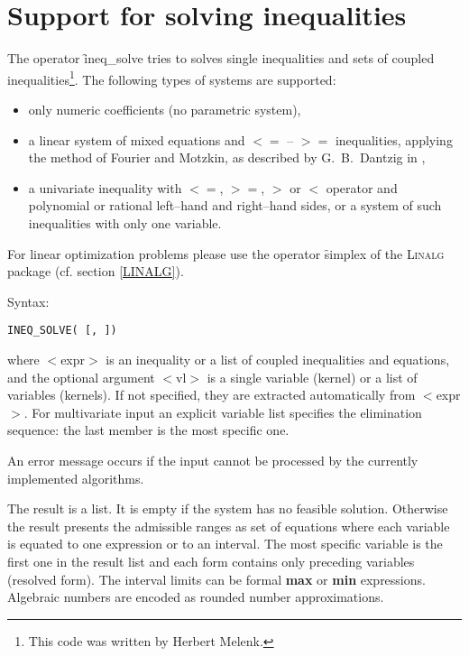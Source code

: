 \section{Support for solving inequalities}
\hypertarget{operator:INEQ_SOLVE}{}
The operator \f{ineq\_solve}
tries to solves single inequalities and sets of coupled inequalities\footnote{This code was written by Herbert Melenk.}.
The following types of systems are supported:
\begin{itemize}
\item only numeric coefficients (no parametric system),
\item a linear system of mixed equations and $<=$ -- $>=$ 
     inequalities, applying the method of Fourier and Motzkin, as described by G.~B.~Dantzig in \cite{Dantzig1963},
\item a univariate inequality with $<=$, $>=$, $>$ or $<$ operator
     and polynomial or rational left--hand and right--hand sides,
     or a system of such inequalities with only one variable.
\end{itemize}
For linear optimization problems please use the operator
\f{simplex} of the \textsc{Linalg} package (cf. section \ref{LINALG}).

Syntax:
\begin{syntax}
  \texttt{INEQ\_SOLVE( [,\,])}
\end{syntax}
where $<$expr$>$ is an inequality or a list of coupled inequalities
and equations, and the optional argument $<$vl$>$ is a single
variable (kernel) or a list of variables (kernels). If not
specified, they are extracted automatically from $<$expr$>$.
For multivariate input an explicit variable list specifies the
elimination sequence: the last member is the most specific one.

An error message occurs if the input cannot be processed by the
currently implemented algorithms.

The result is a list. It is empty if the system has no feasible solution.
Otherwise the result presents the admissible ranges as set
of equations where each variable is equated to 
one expression or to an interval. 
The most specific variable is the first one in the result list and
each form contains only preceding variables (resolved form).
The interval limits can be formal \textbf{max} or \textbf{min} expressions.
Algebraic numbers are encoded as rounded number approximations.

